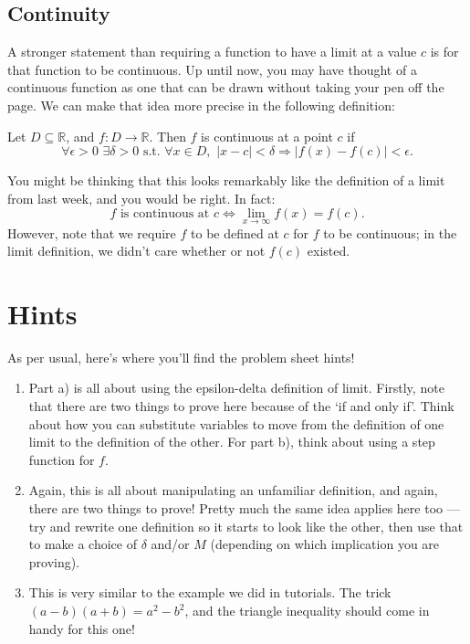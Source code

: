 \documentclass[
  12pt,
  a4paper]{extarticle}
\providecommand{\tightlist}{%
  \setlength{\itemsep}{0pt}\setlength{\parskip}{0pt}}
\theoremstyle{plain}
\theoremstyle{definition}
\theoremstyle{plain}
\theoremstyle{plain}
\theoremstyle{plain}
\theoremstyle{plain}
\theoremstyle{definition}
\theoremstyle{definition}
\theoremstyle{remark}
\theoremstyle{remark}
\let\BeginKnitrBlock\begin \let\EndKnitrBlock\end
\renewcommand{\;}{\,}
\begin{document}
\hypertarget{continuity}{%
\subsection{Continuity}\label{continuity}}

A stronger statement than requiring a function to have a limit at a value \(c\) is for that function to be continuous. Up until now, you may have thought of a continuous function as one that can be drawn without taking your pen off the page. We can make that idea more precise in the following definition:

\BeginKnitrBlock{definition}[Continuity]
{\label{def:def2} }Let \(D \subseteq \mathbb{R}\), and \(f: D \to \mathbb{R}\). Then \(f\) is continuous at a point \(c\) if \[\forall \epsilon > 0\;\;\exists \delta > 0\;\;\text{s.t.}\;\;\forall x \in D,\;\; \lvert x - c \rvert < \delta \Rightarrow \lvert f(x) - f(c) \rvert < \epsilon.\]
\EndKnitrBlock{definition}

You might be thinking that this looks remarkably like the definition of a limit from last week, and you would be right. In fact: \[f\;\;\text{is continuous at}\;\; c \Longleftrightarrow \lim_{x \to \infty}f(x) = f(c).\] However, note that we require \(f\) to be defined at \(c\) for \(f\) to be continuous; in the limit definition, we didn't care whether or not \(f(c)\) existed.

\hypertarget{hints}{%
\section{Hints}\label{hints}}

As per usual, here's where you'll find the problem sheet hints!

\begin{enumerate}
\def\labelenumi{\arabic{enumi})}
\tightlist
\item
  Part a) is all about using the epsilon-delta definition of limit. Firstly, note that there are two things to prove here because of the `if and only if'. Think about how you can substitute variables to move from the definition of one limit to the definition of the other. For part b), think about using a step function for \(f\).
\item
  Again, this is all about manipulating an unfamiliar definition, and again, there are two things to prove! Pretty much the same idea applies here too --- try and rewrite one definition so it starts to look like the other, then use that to make a choice of \(\delta\) and/or \(M\) (depending on which implication you are proving).
\item
  This is very similar to the example we did in tutorials. The trick \((a-b)(a+b) = a^2 - b^2\), and the triangle inequality should come in handy for this one!
\end{enumerate}
\end{document}
